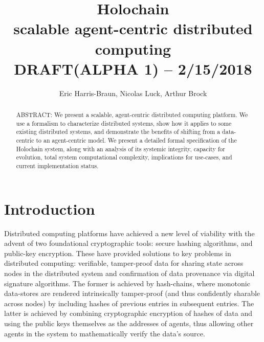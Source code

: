 \documentclass[twocolumn,showpacs,
  nofootinbib,aps,superscriptaddress,
  eqsecnum,prd,notitlepage,showkeys,10pt]{revtex4-1}
\begin{document}
\newcommand\todo[1]{\textcolor{red}{#1}}
\newcommand\term[1]{\textbf{\textit{#1}}}
\newcommand{\sbtc}{$\Omega_{\text{bitcoin}}$}
\newcommand{\sgit}{$\Omega_{\text{git}}$}
\newcommand{\shc}{$\Omega_{\text{hc}}$}
\newcommand{\hcdna}{$\text{DNA}$}
\newcommand{\hcid}{\iota}
\newcommand{\dhtget}{\texttt{get}}
\newcommand{\dhtput}{\texttt{put}}
\newcommand{\dhtstate}{\Delta}
\newcommand{\dhtfns}{F_\mathrm{DHT}}
\newcommand{\sysfns}{F_\mathrm{sys}}
\newcommand{\appfns}{F_\mathrm{app}}
\newcommand{\hcdht}{DHT_\text{hc}}
\newcommand{\chain}{\mathcal{X}}
\newcommand{\eqbang}{\stackrel{!}{=}}

\title{Holochain \\
\small scalable agent-centric distributed computing\\DRAFT(ALPHA 1) -- 2/15/2018}

\author{Eric Harris-Braun, Nicolas Luck, Arthur Brock}


\begin{abstract}
ABSTRACT: We present a scalable, agent-centric distributed computing platform.  We use a  formalism to characterize distributed systems, show how it applies to some existing distributed systems, and demonstrate the benefits of shifting from a data-centric to an agent-centric model. We present a detailed formal specification of the Holochain system, along with an analysis of its systemic integrity, capacity for evolution, total system computational complexity, implications for use-cases, and current implementation status.

\end{abstract}

\maketitle

\section{Introduction}
\label{sec:intro}

Distributed computing platforms have achieved a new level of viability with the advent of two foundational cryptographic tools: secure hashing algorithms, and public-key encryption.  These have provided solutions to key problems in distributed computing: verifiable, tamper-proof data for sharing state across nodes in the distributed system and confirmation of data provenance via digital signature algorithms.  The former is achieved by hash-chains, where monotonic data-stores are rendered intrinsically tamper-proof (and thus confidently sharable across nodes) by including hashes of previous entries in subsequent entries.  The latter is achieved by combining cryptographic encryption of hashes of data and using the public keys themselves as the addresses of agents, thus allowing other agents in the system to mathematically verify the data's source.
\end{document}
